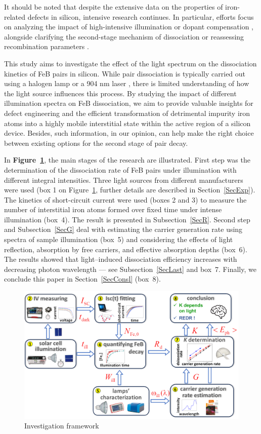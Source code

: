 \documentclass{WileyMSP-template}
\begin{document}
It should be noted that despite the extensive data on the properties of iron-related defects in silicon, intensive research continues.
In particular, efforts focus on analyzing the impact of high-intensive  illumination \cite{FeBStrongIll}
or dopant compensation \cite{Zhu2015},
alongside clarifying the second-stage mechanism of dissociation \cite{Sun2021}
or reassessing recombination parameters \cite{Le2024}.

This study aims to investigate the effect of the light spectrum on the dissociation kinetics of FeB pairs in silicon.
While pair dissociation is typically carried out using a halogen lamp \cite{FeBLight2,Sun2021}
or a 904 nm laser \cite{FeBStrongIll,FeBAssJAP2014,lauer2016}, there is limited understanding of how the light source influences this process.
By studying the impact of different illumination spectra on FeB dissociation,
we aim to provide valuable insights for defect engineering and the efficient transformation of detrimental impurity iron atoms into a highly mobile interstitial state
within the active region of a silicon device.
Besides, such information, in our opinion, can help make the right choice between existing options for the second stage of pair decay.

In \textbf{Figure~\ref{fig1}}, the main stages of the research are illustrated.
First step was the determination of the dissociation rate of FeB pairs under illumination with different integral intensities.
Three light sources from different manufacturers were used (box 1 on Figure~\ref{fig1}, further details are described in Section~\ref{SecExp}).
The kinetics of short-circuit current were used (boxes 2 and 3) to measure the number of interstitial iron atoms formed over fixed time under intense illumination (box~4).
The result is presented in Subsection~\ref{SecR}.
Second step and Subsection~\ref{SecG} deal with estimating the carrier generation rate using spectra of sample illumination (box~5) and considering the effects of light reflection,
absorption by free carriers, and effective absorption depths (box~6).
The results showed that light--induced dissociation efficiency increases with decreasing photon wavelength --- see Subsection~\ref{SecLast} and box~7.
Finally, we conclude this paper in Section~\ref{SecConsl} (box~8).

\begin{figure}
\centering
  \includegraphics[width=0.7\linewidth]{Fig1.png}
  \caption{Investigation framework}
  \label{fig1}
\end{figure}
\end{document}
